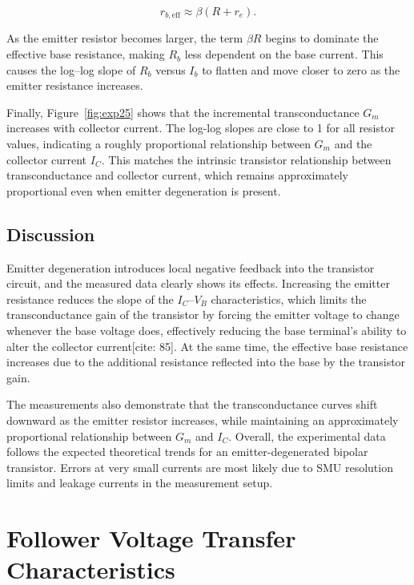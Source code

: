 \documentclass[9pt,a4paper,column,twoside]{tau-class/tau}
\begin{document}
\[
r_{b,\text{eff}} \approx \beta (R + r_e).
\]

As the emitter resistor becomes larger, 
the term $\beta R$ begins to dominate the effective base resistance,
making $R_b$ less dependent on the base current.
This causes the log--log slope of $R_b$ versus $I_b$ to flatten and move 
closer to zero as the emitter resistance increases.

Finally, Figure~\ref{fig:exp25} shows that the 
incremental transconductance $G_m$ increases with collector current. 
The log-log slopes are close to 1 for all resistor values, indicating a roughly proportional 
relationship between $G_m$ and the collector current $I_C$. 
This matches the intrinsic transistor relationship 
between transconductance and collector current, which remains approximately 
proportional even when emitter degeneration is present.

\subsection{Discussion}

Emitter degeneration introduces local negative feedback into the transistor circuit, 
and the measured data clearly shows its effects. 
Increasing the emitter resistance reduces the slope of the $I_C$--$V_B$ characteristics, 
which limits the transconductance gain of the transistor by forcing the emitter voltage to change whenever the base voltage does, effectively reducing the base terminal's ability to alter the collector current[cite: 85]. 
At the same time, the effective base resistance increases due to the additional 
resistance reflected into the base by the transistor gain.

The measurements also demonstrate that the transconductance 
curves shift downward as the emitter resistor increases, 
while maintaining an approximately proportional relationship 
between $G_m$ and $I_C$. Overall, the experimental data follows the 
expected theoretical trends for an emitter-degenerated bipolar transistor.
Errors at very small currents are most likely due to SMU resolution limits 
and leakage currents in the measurement setup.

\section{Follower Voltage Transfer Characteristics}
\end{document}
